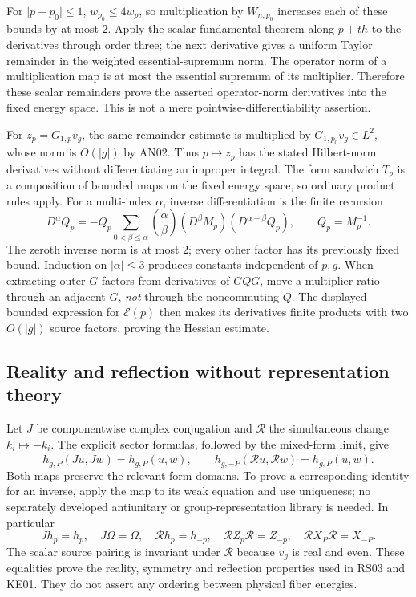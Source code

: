 \documentclass[11pt,a4paper]{article}
\theoremstyle{remark}\newtheorem{remark}[theorem]{Remark}
\newcommand{\abs}[1]{\lvert #1\rvert}\newcommand{\rankone}[2]{\lvert #1\rangle\langle #2\rvert}
\newcommand{\Ecal}{\mathcal E}
\begin{document}
For $\abs{p-p_0}\leq1$, $w_{p_0}\leq4w_p$, so multiplication by $W_{n,p_0}$ increases each of these bounds by at most $2$. Apply the scalar fundamental theorem along $p+th$ to the derivatives through order three; the next derivative gives a uniform Taylor remainder in the weighted essential-supremum norm. The operator norm of a multiplication map is at most the essential supremum of its multiplier. Therefore these scalar remainders prove the asserted operator-norm derivatives into the fixed energy space. This is not a mere pointwise-differentiability assertion.

For $z_p=G_{1,p}v_g$, the same remainder estimate is multiplied by $G_{1,p_0}v_g\in L^2$, whose norm is $O(\abs g)$ by AN02. Thus $p\mapsto z_p$ has the stated Hilbert-norm derivatives without differentiating an improper integral. The form sandwich $T_p$ is a composition of bounded maps on the fixed energy space, so ordinary product rules apply. For a multi-index $\alpha$, inverse differentiation is the finite recursion
\[
 D^\alpha Q_p=-Q_p\sum_{0<\beta\leq\alpha}
       \binom{\alpha}{\beta}(D^\beta M_p)(D^{\alpha-\beta}Q_p),
 \qquad Q_p=M_p^{-1}.
\]
The zeroth inverse norm is at most $2$; every other factor has its previously fixed bound. Induction on $\abs\alpha\leq3$ produces constants independent of $p,g$. When extracting outer $G$ factors from derivatives of $GQG$, move a multiplier ratio through an adjacent $G$, \emph{not} through the noncommuting $Q$. The displayed bounded expression for $\Ecal(p)$ then makes its derivatives finite products with two $O(\abs g)$ source factors, proving the Hessian estimate.

\subsection{Reality and reflection without representation theory}
Let $J$ be componentwise complex conjugation and $\mathcal R$ the simultaneous change $k_i\mapsto-k_i$. The explicit sector formulas, followed by the mixed-form limit, give
\[
 h_{g,P}(Ju,Jw)=\overline{h_{g,P}(u,w)},\qquad
 h_{g,-P}(\mathcal R u,\mathcal R w)=h_{g,P}(u,w).
\]
Both maps preserve the relevant form domains. To prove a corresponding identity for an inverse, apply the map to its weak equation and use uniqueness; no separately developed antiunitary or group-representation library is needed. In particular
\[
 Jh_p=h_p,\quad J\Omega=\Omega,\quad
 \mathcal R h_p=h_{-p},\quad
 \mathcal R Z_p\mathcal R=Z_{-p},\quad
 \mathcal R X_P\mathcal R=X_{-P}.
\]
The scalar source pairing is invariant under $\mathcal R$ because $v_g$ is real and even. These equalities prove the reality, symmetry and reflection properties used in RS03 and KE01. They do not assert any ordering between physical fiber energies.
\end{document}
